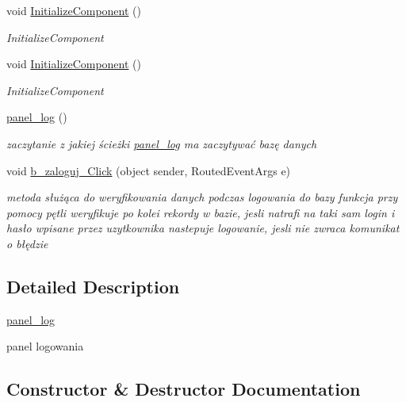 \begin{DoxyCompactItemize}
void \mbox{\hyperlink{classprojekt_1_1panel__log_a4e106ef7dc0b75cb61bb7018dff7e746}{Initialize\+Component}} ()
\begin{DoxyCompactList}\small\item\em Initialize\+Component \end{DoxyCompactList}\item 
void \mbox{\hyperlink{classprojekt_1_1panel__log_a4e106ef7dc0b75cb61bb7018dff7e746}{Initialize\+Component}} ()
\begin{DoxyCompactList}\small\item\em Initialize\+Component \end{DoxyCompactList}\item 
\mbox{\hyperlink{classprojekt_1_1panel__log_a96570278e031a563b59923c0acacae9b}{panel\+\_\+log}} ()
\begin{DoxyCompactList}\small\item\em zaczytanie z jakiej ścieżki \mbox{\hyperlink{classprojekt_1_1panel__log}{panel\+\_\+log}} ma zaczytywać bazę danych \end{DoxyCompactList}\item 
void \mbox{\hyperlink{classprojekt_1_1panel__log_ac071ade9d2f740ce0513d72399bf6847}{b\+\_\+zaloguj\+\_\+\+Click}} (object sender, Routed\+Event\+Args e)
\begin{DoxyCompactList}\small\item\em metoda służąca do weryfikowania danych podczas logowania do bazy funkcja przy pomocy pętli weryfikuje po kolei rekordy w bazie, jesli natrafi na taki sam login i hasło wpisane przez uzytkownika nastepuje logowanie, jesli nie zwraca komunikat o błędzie \end{DoxyCompactList}\end{DoxyCompactItemize}


\subsection{Detailed Description}
\mbox{\hyperlink{classprojekt_1_1panel__log}{panel\+\_\+log}} 

panel logowania 

\subsection{Constructor \& Destructor Documentation}
\mbox{\label{classprojekt_1_1panel__log_a96570278e031a563b59923c0acacae9b}} 
